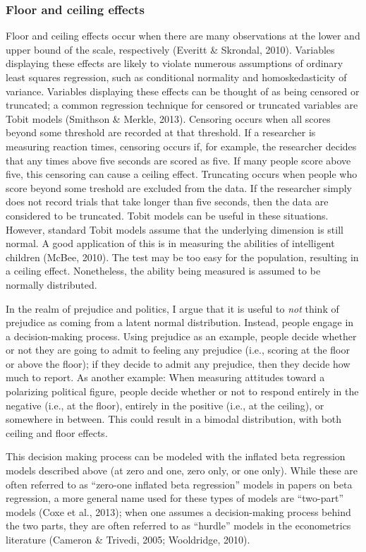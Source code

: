 \documentclass[english,man]{apa6}
\theoremstyle{definition}
\theoremstyle{definition}
\theoremstyle{remark}
\begin{document}
\subsubsection{Floor and ceiling
effects}\label{floor-and-ceiling-effects}

Floor and ceiling effects occur when there are many observations at the
lower and upper bound of the scale, respectively (Everitt \& Skrondal,
2010). Variables displaying these effects are likely to violate numerous
assumptions of ordinary least squares regression, such as conditional
normality and homoskedasticity of variance. Variables displaying these
effects can be thought of as being censored or truncated; a common
regression technique for censored or truncated variables are Tobit
models (Smithson \& Merkle, 2013). Censoring occurs when all scores
beyond some threshold are recorded at that threshold. If a researcher is
measuring reaction times, censoring occurs if, for example, the
researcher decides that any times above five seconds are scored as five.
If many people score above five, this censoring can cause a ceiling
effect. Truncating occurs when people who score beyond some treshold are
excluded from the data. If the researcher simply does not record trials
that take longer than five seconds, then the data are considered to be
truncated. Tobit models can be useful in these situations. However,
standard Tobit models assume that the underlying dimension is still
normal. A good application of this is in measuring the abilities of
intelligent children (McBee, 2010). The test may be too easy for the
population, resulting in a ceiling effect. Nonetheless, the ability
being measured is assumed to be normally distributed.

In the realm of prejudice and politics, I argue that it is useful to
\emph{not} think of prejudice as coming from a latent normal
distribution. Instead, people engage in a decision-making process. Using
prejudice as an example, people decide whether or not they are going to
admit to feeling any prejudice (i.e., scoring at the floor or above the
floor); if they decide to admit any prejudice, then they decide how much
to report. As another example: When measuring attitudes toward a
polarizing political figure, people decide whether or not to respond
entirely in the negative (i.e., at the floor), entirely in the positive
(i.e., at the ceiling), or somewhere in between. This could result in a
bimodal distribution, with both ceiling and floor effects.

This decision making process can be modeled with the inflated beta
regression models described above (at zero and one, zero only, or one
only). While these are often referred to as \enquote{zero-one inflated
beta regression} models in papers on beta regression, a more general
name used for these types of models are \enquote{two-part} models (Coxe
et al., 2013); when one assumes a decision-making process behind the two
parts, they are often referred to as \enquote{hurdle} models in the
econometrics literature (Cameron \& Trivedi, 2005; Wooldridge, 2010).
\end{document}
